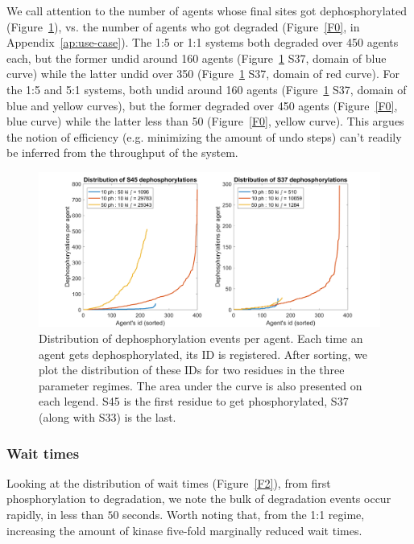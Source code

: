 We call attention to the number of agents whose final sites got
dephosphorylated (Figure~\ref{F1}), vs. the number of agents who got
degraded (Figure~\ref{F0}, in Appendix~\ref{ap:use-case}). The 1:5 or
1:1 systems both degraded over 450 agents each, but the former undid
around 160 agents (Figure~\ref{F1} S37, domain of blue curve) while
the latter undid over 350 (Figure~\ref{F1} S37, domain of red
curve). For the 1:5 and 5:1 systems, both undid around 160 agents
(Figure~\ref{F1} S37, domain of blue and yellow curves), but the
former degraded over 450 agents (Figure~\ref{F0}, blue curve) while
the latter less than 50 (Figure~\ref{F0}, yellow curve). This argues
the notion of efficiency (e.g. minimizing the amount of undo steps)
can't readily be inferred from the throughput of the system.


\begin{figure}[h]
  \centering
  \includegraphics[width=\columnwidth]{wnt/F1_distribution_dephosphorylations_per_agent_brief.png}
  \caption{Distribution of dephosphorylation events per agent. Each
    time an agent gets dephosphorylated, its ID is registered. After
    sorting, we plot the distribution of these IDs for two residues in
    the three parameter regimes. The area under the curve is also
    presented on each legend. S45 is the first residue to get
    phosphorylated, S37 (along with S33) is the last.}
  \label{F1}
\end{figure}


\subsubsection*{Wait times}
Looking at the distribution of wait times (Figure~\ref{F2}), from
first phosphorylation to degradation, we note the bulk of degradation
events occur rapidly, in less than $50$ seconds. Worth noting that,
from the 1:1 regime, increasing the amount of kinase five-fold
marginally reduced wait times.

